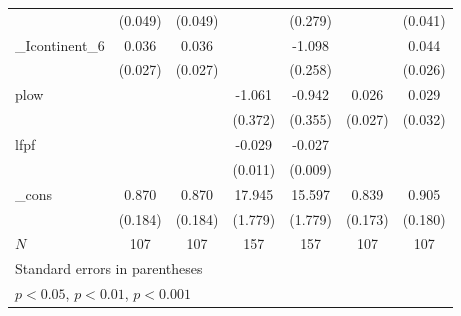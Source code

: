 {\begin{tabular}{l*{6}{c}}
            &     (0.049)         &     (0.049)         &                     &     (0.279)         &                     &     (0.041)         \\
[1em]
\_Icontinent\_6&       0.036         &       0.036         &                     &      -1.098\sym{***}&                     &       0.044         \\
            &     (0.027)         &     (0.027)         &                     &     (0.258)         &                     &     (0.026)         \\
[1em]
plow        &                     &                     &      -1.061\sym{**} &      -0.942\sym{**} &       0.026         &       0.029         \\
            &                     &                     &     (0.372)         &     (0.355)         &     (0.027)         &     (0.032)         \\
[1em]
lfpf        &                     &                     &      -0.029\sym{**} &      -0.027\sym{**} &                     &                     \\
            &                     &                     &     (0.011)         &     (0.009)         &                     &                     \\
[1em]
\_cons      &       0.870\sym{***}&       0.870\sym{***}&      17.945\sym{***}&      15.597\sym{***}&       0.839\sym{***}&       0.905\sym{***}\\
            &     (0.184)         &     (0.184)         &     (1.779)         &     (1.779)         &     (0.173)         &     (0.180)         \\
\hline
\(N\)       &         107         &         107         &         157         &         157         &         107         &         107         \\
\hline\hline
\multicolumn{7}{l}{\footnotesize Standard errors in parentheses}\\
\multicolumn{7}{l}{\footnotesize \sym{*} \(p<0.05\), \sym{**} \(p<0.01\), \sym{***} \(p<0.001\)}\\
\end{tabular}
}

